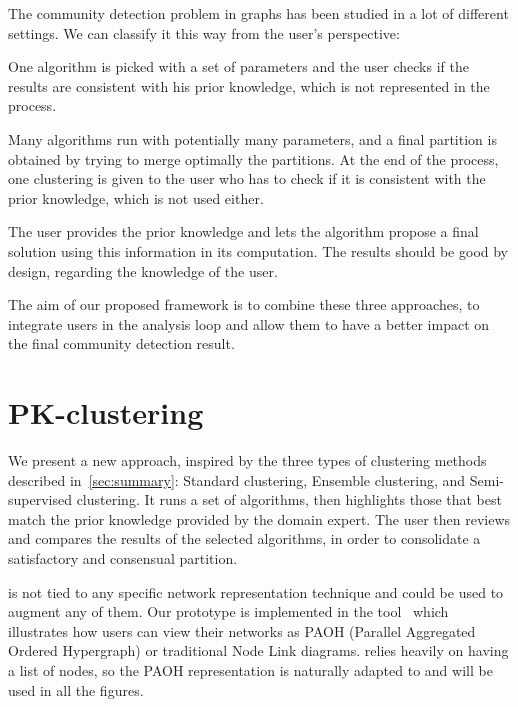The community detection problem in graphs has been studied in a lot of different settings. We can classify it this way from the user's perspective:
\begin{description}[leftmargin=0pt,nosep]
\item [Standard clustering.] One algorithm is picked with a set of parameters and the user checks if the results are consistent with his prior knowledge, which is not represented in the process.
\item [Ensemble clustering.] Many algorithms run with potentially many parameters, and a final partition is obtained by trying to merge optimally the partitions. At the end of the process, one clustering is given to the user who has to check if it is consistent with the prior knowledge, which is not used either.
\item [Semi-supervised clustering.] The user provides the prior knowledge and lets the algorithm propose a final solution using this information in its computation. The results should be good by design, regarding the knowledge of the user.
\end{description}

The aim of our proposed framework is to combine these three approaches, to integrate users in the analysis loop and allow them to have a better impact on the final community detection result.


\section{PK-clustering}

We present a new approach, inspired by the three types of clustering methods described in~\autoref{sec:summary}: Standard clustering, Ensemble clustering, and Semi-supervised clustering. It runs a set of algorithms, then highlights those that best match the prior knowledge provided by the domain expert. %
The user then reviews and compares the results of the selected algorithms, in order to consolidate a satisfactory and consensual partition.

\pkclustering is not tied to any specific network representation technique and could be used to augment any of them. Our prototype is implemented in the \paovis tool~\cite{valdiviaAnalyzingDynamicHypergraphs2021} which illustrates how users can view their networks as PAOH (Parallel Aggregated Ordered Hypergraph) or traditional Node Link diagrams. \pkclustering relies heavily on having a list of nodes, so the PAOH representation is naturally adapted to \pkclustering and will be used in all the figures.

